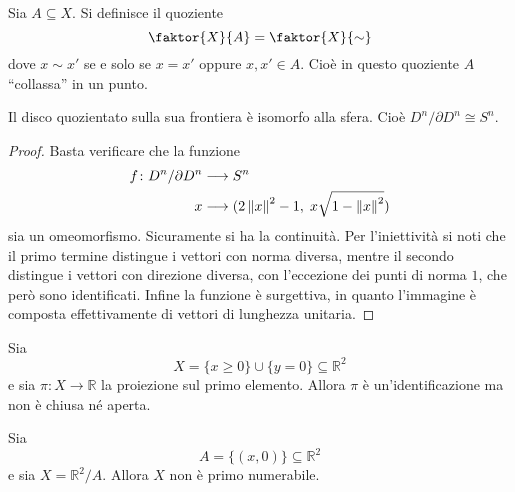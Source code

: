 \begin{defn}
    Sia $A \subseteq X$. Si definisce il quoziente
    \[
    \faktor{X}{A} = \faktor{X}{\sim}
    \]
    dove $x\sim x'$ se e solo se $x = x'$ oppure $x,x'\in A$. Cio\`e in questo quoziente $A$ ``collassa'' in un punto.
\end{defn}

\begin{ex}
    Il disco quozientato sulla sua frontiera \`e isomorfo alla sfera. Cio\`e
    $D^n/\partial D^n\cong S^n$.
\end{ex}
\begin{proof}
    Basta verificare che la funzione
    \begin{align*}
        f\colon D^n/\partial D^n & \longrightarrow S^n\\
        x & \longrightarrow (2 \left\lVert x \right\rVert^2-1,\; x \sqrt{1-\left\lVert x \right\rVert^2})
    \end{align*}
    sia un omeomorfismo. Sicuramente si ha la continuit\`a. Per l'iniettivit\`a
    si noti che il primo termine distingue i vettori con norma diversa, mentre
    il secondo distingue i vettori con direzione diversa, con l'eccezione dei
    punti di norma $1$, che per\`o sono identificati. Infine la funzione \`e
    surgettiva, in quanto l'immagine \`e composta effettivamente di vettori di
    lunghezza unitaria.
\end{proof}

\begin{ex}
    Sia
    \[
        X = \{x \geq 0\} \cup \{y = 0\} \subseteq \mathbb{R}^2
    \]
    e sia $\pi\colon X \longrightarrow \mathbb{R}$ la proiezione sul primo
    elemento. Allora $\pi$ \`e un'identificazione ma non \`e chiusa n\'e aperta.
\end{ex}

\begin{ex}
    Sia
    \[
        A = \{(x, 0)\} \subseteq \mathbb{R}^2
    \]
    e sia $X = \mathbb{R}^2/A$. Allora $X$ non \`e primo numerabile.
\end{ex}
